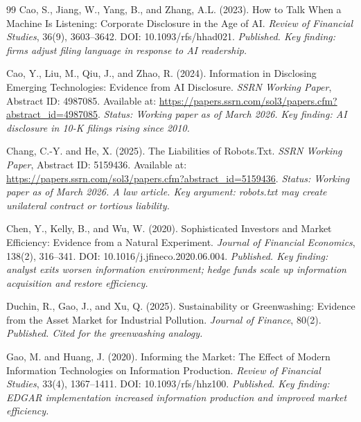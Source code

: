 \documentclass[12pt,a4paper]{article}
\begin{document}
\begin{thebibliography}{99}
Cao, S., Jiang, W., Yang, B., and Zhang, A.L. (2023).
\newblock How to Talk When a Machine Is Listening: Corporate Disclosure in the Age of AI.
\newblock \emph{Review of Financial Studies}, 36(9), 3603--3642.
\newblock DOI: 10.1093/rfs/hhad021.
\newblock \textit{Published. Key finding: firms adjust filing language in response to AI readership.}

Cao, Y., Liu, M., Qiu, J., and Zhao, R. (2024).
\newblock Information in Disclosing Emerging Technologies: Evidence from AI Disclosure.
\newblock \emph{SSRN Working Paper}, Abstract ID: 4987085.
\newblock Available at: \url{https://papers.ssrn.com/sol3/papers.cfm?abstract_id=4987085}.
\newblock \textit{Status: Working paper as of March 2026. Key finding: AI disclosure in 10-K filings rising since 2010.}

Chang, C.-Y. and He, X. (2025).
\newblock The Liabilities of Robots.Txt.
\newblock \emph{SSRN Working Paper}, Abstract ID: 5159436.
\newblock Available at: \url{https://papers.ssrn.com/sol3/papers.cfm?abstract_id=5159436}.
\newblock \textit{Status: Working paper as of March 2026. A law article. Key argument: robots.txt may create unilateral contract or tortious liability.}

Chen, Y., Kelly, B., and Wu, W. (2020).
\newblock Sophisticated Investors and Market Efficiency: Evidence from a Natural Experiment.
\newblock \emph{Journal of Financial Economics}, 138(2), 316--341.
\newblock DOI: 10.1016/j.jfineco.2020.06.004.
\newblock \textit{Published. Key finding: analyst exits worsen information environment; hedge funds scale up information acquisition and restore efficiency.}

Duchin, R., Gao, J., and Xu, Q. (2025).
\newblock Sustainability or Greenwashing: Evidence from the Asset Market for Industrial Pollution.
\newblock \emph{Journal of Finance}, 80(2).
\newblock \textit{Published. Cited for the greenwashing analogy.}

Gao, M. and Huang, J. (2020).
\newblock Informing the Market: The Effect of Modern Information Technologies on Information Production.
\newblock \emph{Review of Financial Studies}, 33(4), 1367--1411.
\newblock DOI: 10.1093/rfs/hhz100.
\newblock \textit{Published. Key finding: EDGAR implementation increased information production and improved market efficiency.}


\end{thebibliography}
\end{document}
